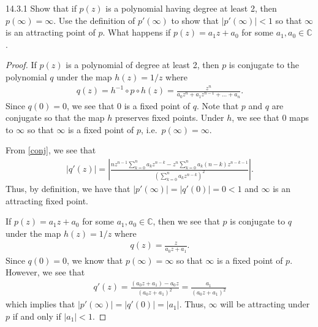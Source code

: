 \begin{problem}{14.3.1}
  Show that if $p(z)$ is a polynomial having degree at least 2, then $p(\infty) = \infty$.
  Use the definition of $p'(\infty)$ to show that $|p'(\infty)| < 1$ so that $\infty$
  is an attracting point of $p$. What happens if $p(z) = a_1z + a_0$ for some $a_1,a_0 \in \mathbb{C}$.
\end{problem}

\begin{proof}
  If $p(z)$ is a polynomial of degree at least 2, then $p$ is conjugate to the polynomial $q$
  under the map $h(z) = 1/z$ where
  \begin{align}\label{conj}
    q(z) = h^{-1} \circ p \circ h (z) = \frac{z^n}{a_0 z^n + a_1z^{n-1} + \dots + a_n}.
  \end{align}
  Since $q(0) = 0$, we see that $0$ is a fixed point of $q$. Note that $p$ and $q$
  are conjugate so that the map $h$ preserves fixed points. Under $h$, we see that $0$ maps to $\infty$
  so that $\infty$ is a fixed point of $p$, i.e.\ $p(\infty) = \infty$.

  From \eqref{conj}, we see that
  \begin{align*}
    |q'(z)| = \left|\frac{n z^{n-1} \sum_{k=0}^n a_k z^{n-k} - z^n \sum_{k=0}^{n} a_k(n-k) z^{n-k-1}  }{\left( \sum_{k=0}^n a_k z^{n-k} \right)^2}\right|.
  \end{align*}
  Thus, by definition, we have that $|p'(\infty)| = |q'(0)| = 0 < 1$ and $\infty$
  is an attracting fixed point.

  If $p(z) = a_1 z + a_0$ for some $a_1,a_0 \in \mathbb{C}$, then we see that $p$
  is conjugate to $q$ under the map $h(z) = 1/z$ where
  \begin{align*}
    q(z) = \frac{z}{a_0z + a_1}.
  \end{align*}
  Since $q(0)=0$, we know that $p(\infty) = \infty$ so that $\infty$ is a fixed point of $p$.
  However, we see that
  \begin{align*}
    q'(z) = \frac{(a_0z + a_1) - a_0z}{(a_0z + a_1)^2} = \frac{a_1}{(a_0z + a_1)^2}
  \end{align*}
  which implies that $|p'(\infty)| = |q'(0)| = |a_1|$.
  Thus, $\infty$ will be attracting under $p$ if and only if $|a_1| < 1$.
\end{proof}
\newpage
